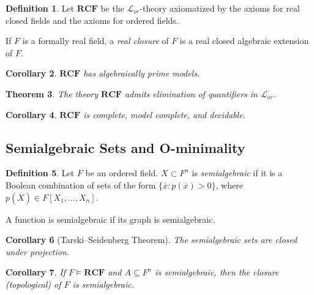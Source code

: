\documentclass{amsart}
\newtheorem{theorem}{Theorem}[subsection]
\newtheorem{corollary}[theorem]{Corollary}
\theoremstyle{definition}
\newtheorem{definition}[theorem]{Definition}
\numberwithin{equation}{section}
\begin{document}
\begin{definition}
  Let $\mathbf{RCF}$ be the $\mathcal{L}_{or}$-theory axiomatized by the axioms for real closed fields
  and the axioms for ordered fields.

  If $F$ is a formally real field, a \emph{real closure} of $F$ is a real closed algebraic extension of $F$.
\end{definition}


\begin{corollary}
  $\mathbf{RCF}$ has algebraically prime models.
\end{corollary}

\begin{theorem}
  The theory $\mathbf{RCF}$ admits elimination of quantifiers in $\mathcal{L}_{or}$.
\end{theorem}

\begin{corollary}
  $\mathbf{RCF}$ is complete, model complete, and decidable.
\end{corollary}

\subsection{Semialgebraic Sets and O-minimality}
\begin{definition}
  Let $F$ be an ordered field.
  $X \subset F^n$ is \emph{semialgebraic} if it is a Boolean combination of sets of the form $\{\overline{x}:p(\overline{x})>0\}$,
  where $p(\overline{X}) \in F[X_1,\dots,X_n]$.

  A function is semialgebraic if its graph is semialgebraic.
\end{definition}

\begin{corollary}[Tarski--Seidenberg Theorem]
  The semialgebraic sets are closed under projection.
\end{corollary}

\begin{corollary}
  If $F \models \mathbf{RCF}$ and $A \subseteq F^n$ is semialgebraic,
  then the closure (topological) of $F$ is semialgebraic.
\end{corollary}
\end{document}
